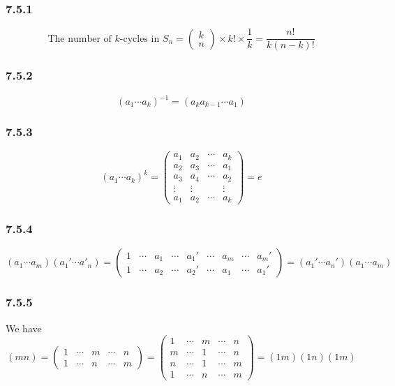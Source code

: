 \documentclass[]{ctexart}
\begin{document}
\subsubsection*{7.5.1}
\begin{equation*}
\text{The number of $k$-cycles in $S_n$}=\begin{pmatrix}
k\\n
\end{pmatrix}\times k!\times\frac{1}{k}=\frac{n!}{k(n-k)!}
\end{equation*}
\subsubsection*{7.5.2}
\begin{equation*}
(a_1\cdots a_k)^{-1}=(a_ka_{k-1}\cdots a_1)
\end{equation*}
\subsubsection*{7.5.3}
\begin{equation*}
(a_1\cdots a_k)^k=\begin{pmatrix}
a_1 & a_2 & \cdots & a_k\\
a_2 & a_3 & \cdots & a_1\\
a_3 & a_4 & \cdots & a_2\\
\vdots & \vdots & \; & \vdots\\
a_1 & a_2 & \cdots & a_k
\end{pmatrix}=e
\end{equation*}
\subsubsection*{7.5.4}
\begin{equation*}
(a_1\cdots a_m)(a_1'\cdots a'_n)=\begin{pmatrix}
1 & \cdots & a_1 &\cdots& a_1'&\cdots & a_m&\cdots & a_m'\\
1 & \cdots & a_2 &\cdots &a_2'&\cdots & a_1&\cdots & a_1'
\end{pmatrix}=(a_1'\cdots a_n')(a_1\cdots a_m)
\end{equation*}
\subsubsection*{7.5.5}
We have 
\begin{equation*}
(mn)=\begin{pmatrix}
1 & \cdots & m & \cdots & n\\
1 & \cdots & n & \cdots & m
\end{pmatrix}=\begin{pmatrix}
1 & \cdots & m & \cdots & n \\
m & \cdots  &1 & \cdots & n\\
n & \cdots &1 & \cdots & m\\
1 & \cdots & n & \cdots &m
\end{pmatrix}=(1m)(1n)(1m)
\end{equation*}
\end{document}
